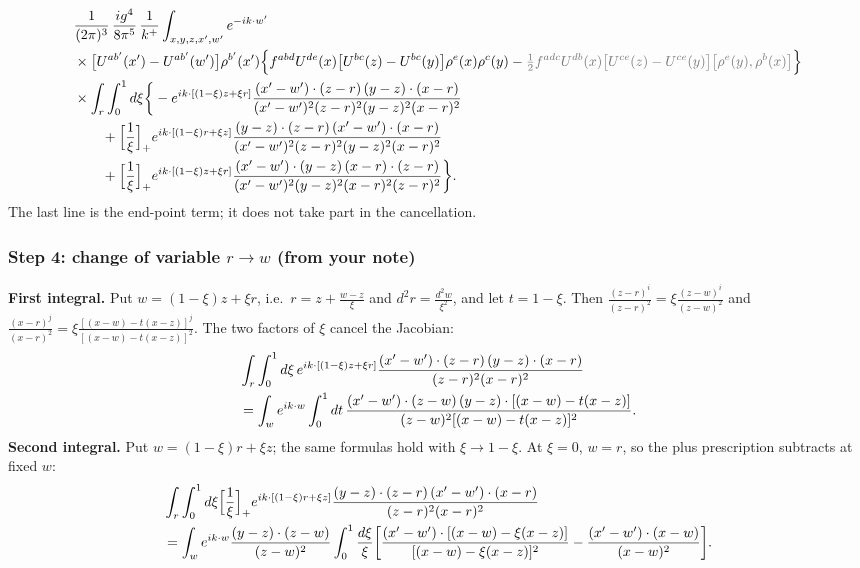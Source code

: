 \documentclass[9pt]{article}
\newcommand{\Gr}[1]{{\color{cX}#1}}
\numberwithin{equation}{section}
\begin{document}
\begin{align}
&\frac{1}{(2\pi)^{3}}\,\frac{ig^{4}}{8\pi^{5}}\,\frac{1}{k^{+}}\int_{x,y,z,x',w'}e^{-ik\cdot w'}\notag\\
&\times\big[U^{ab'}(x')-U^{ab'}(w')\big]\rho^{b'}(x')\Big\{f^{abd}U^{de}(x)\big[U^{bc}(z)-U^{bc}(y)\big]\rho^{e}(x)\rho^{c}(y)-\Gr{\tfrac12f^{adc}U^{db}(x)\big[U^{ce}(z)-U^{ce}(y)\big]\big[\rho^{e}(y),\rho^{b}(x)\big]}\Big\}\notag\\
&\times\int_{r}\int_{0}^{1}d\xi\bigg\{-e^{ik\cdot[(1-\xi)z+\xi r]}\frac{(x'-w')\cdot(z-r)\,(y-z)\cdot(x-r)}{(x'-w')^{2}(z-r)^{2}(y-z)^{2}(x-r)^{2}}\notag\\
&\qquad+\Big[\frac1\xi\Big]_{+}e^{ik\cdot[(1-\xi)r+\xi z]}\frac{(y-z)\cdot(z-r)\,(x'-w')\cdot(x-r)}{(x'-w')^{2}(z-r)^{2}(y-z)^{2}(x-r)^{2}}\notag\\
&\qquad+\Big[\frac1\xi\Big]_{+}e^{ik\cdot[(1-\xi)z+\xi r]}\frac{(x'-w')\cdot(y-z)\,(x-r)\cdot(z-r)}{(x'-w')^{2}(y-z)^{2}(x-r)^{2}(z-r)^{2}}\bigg\}.
\end{align}
The last line is the end-point term; it does not take part in the cancellation.

\subsubsection*{Step 4: change of variable $r\to w$ (from your note)}
\textbf{First integral.} Put $w=(1-\xi)z+\xi r$, i.e.\ $r=z+\frac{w-z}{\xi}$ and $d^{2}r=\frac{d^{2}w}{\xi^{2}}$, and let $t=1-\xi$. Then $\frac{(z-r)^{i}}{(z-r)^{2}}=\xi\frac{(z-w)^{i}}{(z-w)^{2}}$ and $\frac{(x-r)^{j}}{(x-r)^{2}}=\xi\frac{[(x-w)-t(x-z)]^{j}}{[(x-w)-t(x-z)]^{2}}$. The two factors of $\xi$ cancel the Jacobian:
\begin{align}
&\int_{r}\int_{0}^{1}d\xi\,e^{ik\cdot[(1-\xi)z+\xi r]}\frac{(x'-w')\cdot(z-r)\,(y-z)\cdot(x-r)}{(z-r)^{2}(x-r)^{2}}\notag\\
&=\int_{w}e^{ik\cdot w}\int_{0}^{1}dt\,\frac{(x'-w')\cdot(z-w)\,(y-z)\cdot[(x-w)-t(x-z)]}{(z-w)^{2}[(x-w)-t(x-z)]^{2}}.
\end{align}
\textbf{Second integral.} Put $w=(1-\xi)r+\xi z$; the same formulas hold with $\xi\to1-\xi$. At $\xi=0$, $w=r$, so the plus prescription subtracts at fixed $w$:
\begin{align}
&\int_{r}\int_{0}^{1}d\xi\Big[\frac1\xi\Big]_{+}e^{ik\cdot[(1-\xi)r+\xi z]}\frac{(y-z)\cdot(z-r)\,(x'-w')\cdot(x-r)}{(z-r)^{2}(x-r)^{2}}\notag\\
&=\int_{w}e^{ik\cdot w}\frac{(y-z)\cdot(z-w)}{(z-w)^{2}}\int_{0}^{1}\frac{d\xi}{\xi}\bigg[\frac{(x'-w')\cdot[(x-w)-\xi(x-z)]}{[(x-w)-\xi(x-z)]^{2}}-\frac{(x'-w')\cdot(x-w)}{(x-w)^{2}}\bigg].
\end{align}
\end{document}

